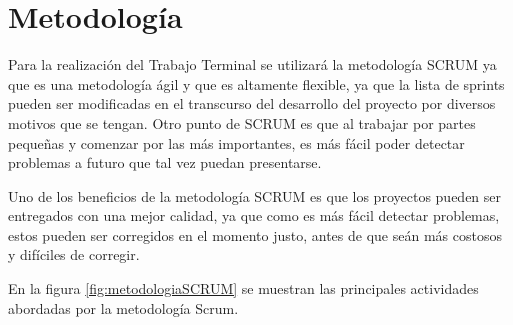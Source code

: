 
\section{Metodología}
Para la realización del Trabajo Terminal se utilizará la metodología SCRUM ya que es una metodología ágil y que es altamente flexible, ya que la lista de sprints pueden ser modificadas en el transcurso del desarrollo del proyecto por diversos motivos que se tengan. Otro punto de SCRUM es que al trabajar por partes pequeñas y comenzar por las más importantes, es más fácil poder detectar problemas a futuro que tal vez puedan presentarse\cite{Referencia11}.

Uno de los beneficios de la metodología SCRUM es que los proyectos pueden ser entregados con una mejor calidad, ya que como es más fácil detectar problemas, estos pueden ser corregidos en el momento justo, antes de que seán más costosos y difíciles de corregir. 

En la figura \ref{fig:metodologiaSCRUM} se muestran las principales actividades abordadas por la metodología Scrum.

